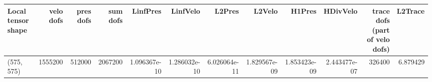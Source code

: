 \begin{tabular}{lrrrrrrrrrrr}
\toprule
Local tensor shape &  velo dofs &  pres dofs &  sum dofs &     LinfPres &     LinfVelo &       L2Pres &       L2Velo &       H1Pres &     HDivVelo &  trace dofs (part of velo dofs) &  L2Trace \\
\midrule
        (575, 575) &    1555200 &     512000 &   2067200 & 1.096367e-10 & 1.286032e-10 & 6.026064e-11 & 1.829567e-09 & 1.853423e-09 & 2.443477e-07 &                          326400 & 6.879429 \\
\bottomrule
\end{tabular}
